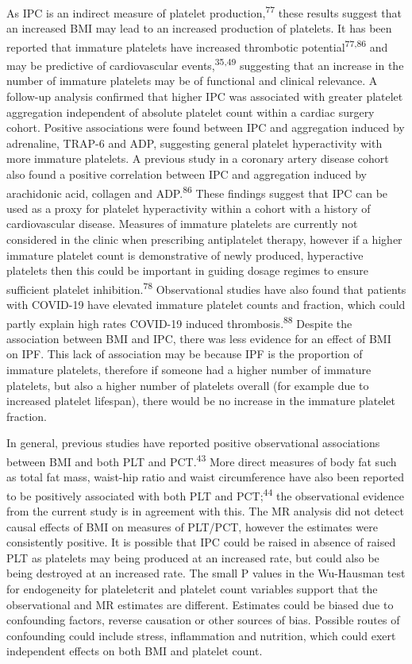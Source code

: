 \documentclass[11pt,twoside]{bristolthesis}
\begin{document}
As IPC is an indirect measure of platelet production,\textsuperscript{77} these results suggest that an increased BMI may lead to an increased production of platelets. It has been reported that immature platelets have increased thrombotic potential\textsuperscript{77,86} and may be predictive of cardiovascular events,\textsuperscript{35,49} suggesting that an increase in the number of immature platelets may be of functional and clinical relevance. A follow-up analysis confirmed that higher IPC was associated with greater platelet aggregation independent of absolute platelet count within a cardiac surgery cohort. Positive associations were found between IPC and aggregation induced by adrenaline, TRAP-6 and ADP, suggesting general platelet hyperactivity with more immature platelets. A previous study in a coronary artery disease cohort also found a positive correlation between IPC and aggregation induced by arachidonic acid, collagen and ADP.\textsuperscript{86} These findings suggest that IPC can be used as a proxy for platelet hyperactivity within a cohort with a history of cardiovascular disease. Measures of immature platelets are currently not considered in the clinic when prescribing antiplatelet therapy, however if a higher immature platelet count is demonstrative of newly produced, hyperactive platelets then this could be important in guiding dosage regimes to ensure sufficient platelet inhibition.\textsuperscript{78} Observational studies have also found that patients with COVID-19 have elevated immature platelet counts and fraction, which could partly explain high rates COVID-19 induced thrombosis.\textsuperscript{88} Despite the association between BMI and IPC, there was less evidence for an effect of BMI on IPF. This lack of association may be because IPF is the proportion of immature platelets, therefore if someone had a higher number of immature platelets, but also a higher number of platelets overall (for example due to increased platelet lifespan), there would be no increase in the immature platelet fraction.

In general, previous studies have reported positive observational associations between BMI and both PLT and PCT.\textsuperscript{43} More direct measures of body fat such as total fat mass, waist-hip ratio and waist circumference have also been reported to be positively associated with both PLT and PCT;\textsuperscript{44} the observational evidence from the current study is in agreement with this. The MR analysis did not detect causal effects of BMI on measures of PLT/PCT, however the estimates were consistently positive. It is possible that IPC could be raised in absence of raised PLT as platelets may being produced at an increased rate, but could also be being destroyed at an increased rate. The small P values in the Wu-Hausman test for endogeneity for plateletcrit and platelet count variables support that the observational and MR estimates are different. Estimates could be biased due to confounding factors, reverse causation or other sources of bias. Possible routes of confounding could include stress, inflammation and nutrition, which could exert independent effects on both BMI and platelet count.
\end{document}
